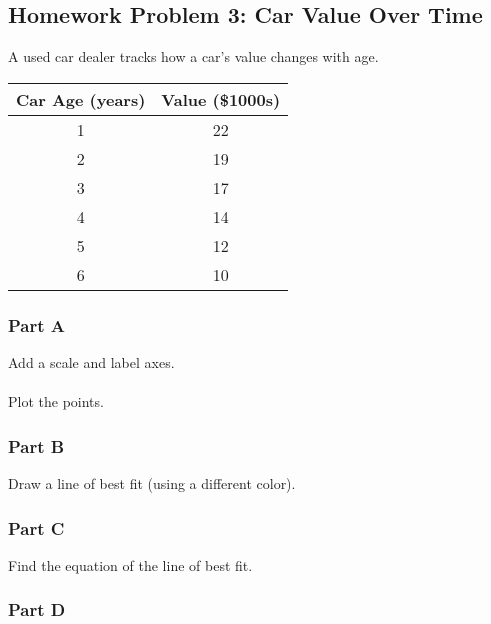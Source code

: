 \documentclass[12pt]{article}
\begin{document}
\begin{itemize}
				\vspace{2cm}

				\newpage

		\subsection*{Homework Problem 3: Car Value Over Time}

			A used car dealer tracks how a car's value changes with age.

			\begin{center}
				\begin{tabular}{|c|c|}
					\hline
					Car Age (years) & Value (\$1000s) \\
					\hline
					1 & 22 \\
					2 & 19 \\
					3 & 17 \\
					4 & 14 \\
					5 & 12 \\
					6 & 10 \\
					\hline
				\end{tabular}
			\end{center}

			\subsubsection*{Part A}
			
				Add a scale and label axes.\\\\
				Plot the points.

				\vspace{8cm}

			\subsubsection*{Part B}
			
				Draw a line of best fit (using a different color).

				\newpage

			\subsubsection*{Part C}
			
				Find the equation of the line of best fit.

				\vspace{4cm}

			\subsubsection*{Part D}
			

\end{itemize}
\end{document}
